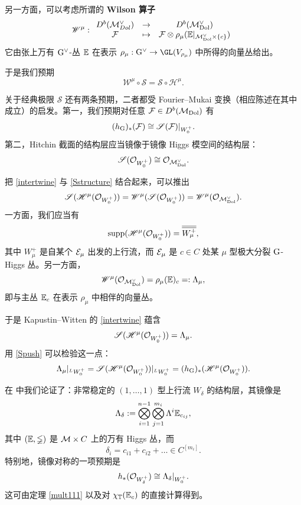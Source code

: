 另一方面，可以考虑所谓的 \textbf{Wilson 算子}
\[
\mathscr{W}^\mu : \begin{array}{ccc} D^b({\mathcal{M}}^\vee_{Dol}) &\to& D^b({\mathcal{M}}^\vee_{\mathrm{Dol}}) \\ {\mathcal{F}} &\mapsto& {\mathcal{F}}\otimes \rho_\mu({\mathbb{E}}|_{{\mathcal{M}}^\vee_{{\mathrm{Dol}}}\times \{c\}}) \end{array}
\]
它由张上万有 $\mathrm{G}^\vee$-丛 ${\mathbb{E}}$ 在表示 $\rho_\mu: \G^\vee\to \GL(V_{\rho_\mu})$ 中所得的向量丛给出。

于是我们预期 \cite{donagi-pantev,kapustin-witten}
\begin{equation}\label{intertwine}
\mathscr{W}^\mu \circ \mathscr{S} = \mathscr{S} \circ \mathscr{H}^\mu.
\end{equation}

关于经典极限 $\mathscr{S}$ 还有两条预期，二者都受 Fourier--Mukai 变换（相应陈述在其中成立）的启发。第一，我们预期对任意 ${\mathcal{F}}\in D^b({\mathcal{M}}_{\mathrm{Dol}})$ 有
\begin{equation}\label{Spush}
(h_{\mathrm{G}})_*({\mathcal{F}})\cong \mathscr{S}({\mathcal{F}})|_{W^+_0}.
\end{equation}
第二，Hitchin 截面的结构层应当镜像于镜像 Higgs 模空间的结构层：
\begin{equation}\label{Sstructure}
\mathscr{S}({\mathcal O}_{W^+_0})\cong {\mathcal O}_{{\mathcal{M}}^\vee_{{\mathrm{Dol}}}}.
\end{equation}

把 \eqref{intertwine} 与 \eqref{Sstructure} 结合起来，可以推出
\[
\mathscr{S}(\mathscr{H}^\mu({\mathcal O}_{W^+_0}))=\mathscr{W}^\mu(\mathscr{S}({\mathcal O}_{W^+_0}))=\mathscr{W}^\mu({\mathcal O}_{{\mathcal{M}}^\vee_{{\mathrm{Dol}}}}).
\]
一方面，我们应当有
\[
\mathrm{supp}(\mathscr{H}^\mu({\mathcal O}_{W^+_0}))=\overline{\overline{W^+_\mu}},
\]
其中 $W_\mu^+$ 是自某个 ${\mathcal E}_\mu$ 出发的上行流，而 ${\mathcal E}_\mu$ 是 $c\in C$ 处某 $\mu$ 型极大分裂 $\mathrm{G}$-Higgs 丛。另一方面，
\[
\mathscr{W}^\mu({\mathcal O}_{{\mathcal{M}}^\vee_{{\mathrm{Dol}}}})=\rho_\mu({\mathbb{E}})_c=:\Lambda_\mu,
\]
即与主丛 ${\mathbb{E}}_c$ 在表示 $\rho_\mu$ 中相伴的向量丛。

于是 Kapustin--Witten 的 \eqref{intertwine} 蕴含
\[
\mathscr{S}(\mathscr{H}^\mu({\mathcal O}_{W^+_0}))=\Lambda_\mu.
\]
用 \eqref{Spush} 可以检验这一点：
\[
\Lambda_\mu|_{ ^{L}W_0^+}= \mathscr{S}(\mathscr{H}^\mu({\mathcal O}_{W^+_0}))|_{ ^{L}W_0^+}=(h_{\mathrm{G}})_*(\mathscr{H}^\mu({\mathcal O}_{W^+_0})).
\]

在 \cite{hausel-hitchin} 中我们论证了：非常稳定的 $(1,\dots,1)$ 型上行流 $W_{\delta}$ 的结构层，其镜像是
\[
\Lambda_\delta:=\bigotimes_{i=1}^{n-1} \bigotimes_{j=1}^{m_i} \Lambda^i\mathbb{E}_{c_{ij}},
\]
其中 $(\mathbb{E},{\mathbb{\Phi}})$ 是 ${\mathcal{M}}\times C$ 上的万有 Higgs 丛，而
\[
\delta_i=c_{i1}+c_{i2}+\dots \in C^{[m_i]}.
\]
特别地，镜像对称的一项预期是
\[
h_*({\mathcal O}_{W^+_\delta})\cong \Lambda_\delta|_{W^+_0}.
\]
这可由定理 \ref{mult111} 以及对 $\chi_{\mathbb{T}} (\mathbb{E}_c)$ 的直接计算得到。

